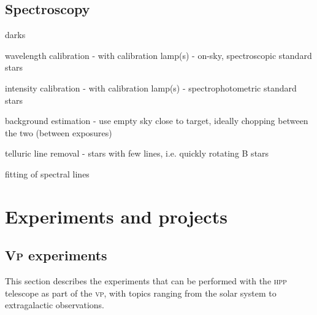 \documentclass[a4paper, 11pt, fleqn]{memoir}
\begin{document}

\chapter{Spectroscopy}

darks

wavelength calibration - with calibration lamp(s) - on-sky, spectroscopic
standard stars

intensity calibration - with calibration lamp(s) - spectrophotometric standard
stars

background estimation - use empty sky close to target, ideally chopping between
the two (between exposures)

telluric line removal - stars with few lines, i.e. quickly rotating B stars

fitting of spectral lines

\part{Experiments and projects}

\chapter{\textsc{Vp} experiments}

This section describes the experiments that can be performed with the \textsc{hpp} telescope as part of the \textsc{vp}, with topics ranging from the solar system to extragalactic observations.
\end{document}
